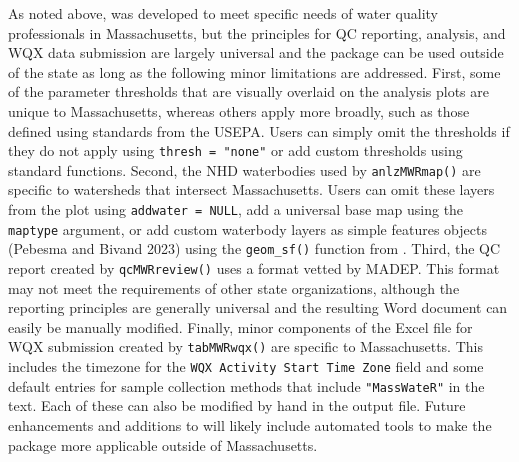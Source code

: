 As noted above,  was developed to meet specific needs of water quality professionals in Massachusetts, but the principles for QC reporting, analysis, and WQX data submission are largely universal and the package can be used outside of the state as long as the following minor limitations are addressed. First, some of the parameter thresholds that are visually overlaid on the analysis plots are unique to Massachusetts, whereas others apply more broadly, such as those defined using standards from the USEPA. Users can simply omit the thresholds if they do not apply using \texttt{thresh\ =\ "none"} or add custom thresholds using standard  functions. Second, the NHD waterbodies used by \texttt{anlzMWRmap()} are specific to watersheds that intersect Massachusetts. Users can omit these layers from the plot using \texttt{addwater\ =\ NULL}, add a universal base map using the \texttt{maptype} argument, or add custom waterbody layers as simple features objects (Pebesma and Bivand 2023) using the \texttt{geom\_sf()} function from . Third, the QC report created by \texttt{qcMWRreview()} uses a format vetted by MADEP. This format may not meet the requirements of other state organizations, although the reporting principles are generally universal and the resulting Word document can easily be manually modified. Finally, minor components of the Excel file for WQX submission created by \texttt{tabMWRwqx()} are specific to Massachusetts. This includes the timezone for the \texttt{WQX\ Activity\ Start\ Time\ Zone} field and some default entries for sample collection methods that include \texttt{"MassWateR"} in the text. Each of these can also be modified by hand in the output file. Future enhancements and additions to  will likely include automated tools to make the package more applicable outside of Massachusetts.

